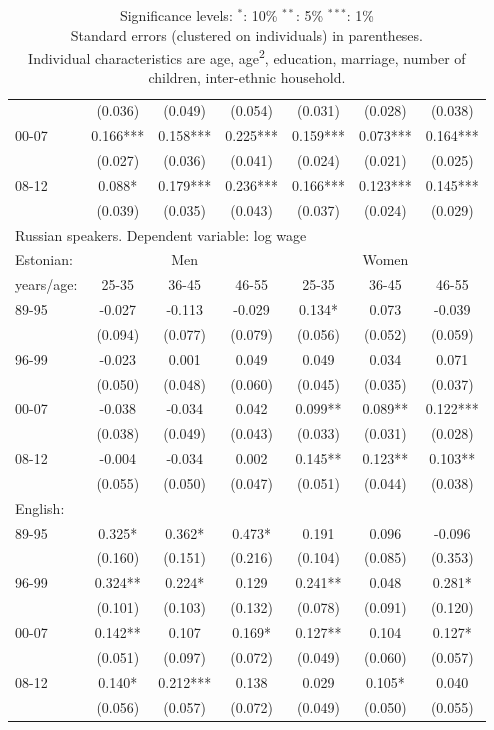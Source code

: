 \documentclass[12pt, a4paper]{article}
\def\tenpc{$^{\ast}$}
\def\fivepc{$^{\ast\ast}$}
\def\onepc{$^{\ast\ast\ast}$}
\newcommand{\legend}{\normalsize{Significance levels:\hspace{1em} \tenpc : 10\% \hspace{1em} \fivepc : 5\% \hspace{1em} \onepc : 1\% \normalsize}}
\newcommand{\modelTwo}{age, age\textsuperscript{2}, education, marriage, number of children, inter-ethnic household} %
\providecommand{\DIFaddend}{} %
\DeclareRobustCommand{\DIFaddend}{\DIFOaddend \let\includegraphics\DIFOincludegraphics} %
\begin{document}
\begin{table}[htbp]
\begin{tabular}{lccc|cc c}
		      & (0.036) & (0.049) & (0.054) & (0.031) & (0.028) & (0.038) \\
		00-07   & 0.166*** & 0.158*** & 0.225*** & 0.159*** & 0.073*** & 0.164*** \\
		      & (0.027) & (0.036) & (0.041) & (0.024) & (0.021) & (0.025) \\
		08-12   & 0.088*  & 0.179*** & 0.236*** & 0.166*** & 0.123*** & 0.145*** \\
		      & (0.039) & (0.035) & (0.043) & (0.037) & (0.024) & (0.029) \\ 
     \midrule
		\multicolumn{7}{l}{Russian speakers. Dependent variable: log wage}\\
		\midrule
		Estonian:&\multicolumn{3}{c|}{Men} &\multicolumn{3}{c}{Women}\\
		years/age: & 25-35  & 36-45  & 46-55  & 25-35  & 36-45  & 46-55  \\
		\midrule
		89-95   & -0.027 & -0.113  & -0.029 & 0.134* & 0.073  & -0.039  \\
		      & (0.094) & (0.077) & (0.079) & (0.056) & (0.052) & (0.059) \\
		96-99   & -0.023 & 0.001  & 0.049  & 0.049  & 0.034  & 0.071  \\
		      & (0.050) & (0.048) & (0.060) & (0.045) & (0.035) & (0.037) \\
		00-07   & -0.038 & -0.034  & 0.042  & 0.099** & 0.089** & 0.122*** \\
		      & (0.038) & (0.049) & (0.043) & (0.033) & (0.031) & (0.028) \\
		08-12   & -0.004 & -0.034  & 0.002  & 0.145** & 0.123** & 0.103** \\
		      & (0.055) & (0.050) & (0.047) & (0.051) & (0.044) & (0.038) \\ \midrule
		English:  &     &     &     &     &     & 
           \\

		89-95   & 0.325* & 0.362*  & 0.473* & 0.191  & 0.096  & -0.096  \\
		      & (0.160) & (0.151) & (0.216) & (0.104) & (0.085) & (0.353) \\
		96-99   & 0.324** & 0.224*  & 0.129  & 0.241** & 0.048  & 0.281*  \\
		      & (0.101) & (0.103) & (0.132) & (0.078) & (0.091) & (0.120) \\
		00-07   & 0.142** & 0.107  & 0.169* & 0.127** & 0.104  & 0.127*  \\
		      & (0.051) & (0.097) & (0.072) & (0.049) & (0.060) & (0.057) \\
		08-12   & 0.140* & 0.212*** & 0.138  & 0.029  & 0.105* & 0.040  \\
		      & (0.056) & (0.057) & (0.072) & (0.049) & (0.050) & (0.055) \\
		\bottomrule
	\end{tabular}

	\caption*{\legend \\ Standard errors (clustered on individuals) in parentheses. \\ Individual characteristics are \modelTwo. 	}
	\label{tab:age_group_trend}
\end{table}
\DIFaddend 
\end{document}
